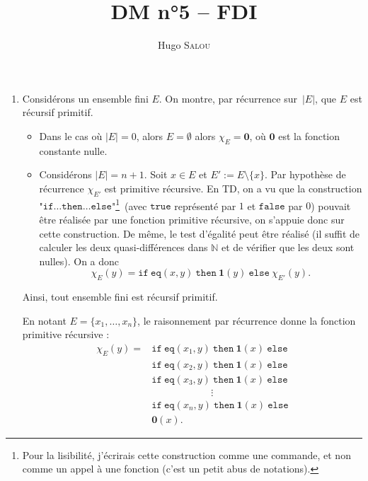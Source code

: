 \documentclass{../../notes}
\title{DM n°5 -- FDI}
\author{Hugo \scshape Salou}
\begin{document}
  \maketitle

  \begin{enumerate}
    \item Considérons un ensemble fini $E$.
      On montre, par récurrence sur~$|E|$, que $E$ est récursif primitif.\label{q1}
      \begin{itemize}
        \item Dans le cas où $|E| = 0$, alors $E = \emptyset$ alors $\chi_E = \mathbf{0}$, où $\mathbf{0}$ est la fonction constante nulle.
        \item Considérons $|E| = n + 1$.
          Soit $x \in E$ et $E' := E \setminus \{x\}$.
          Par hypothèse de récurrence $\chi_{E'}$ est primitive récursive.
          En TD, on a vu que la construction "$\mathtt{if}\ldots \mathtt{then}\ldots \mathtt{else}$"\footnote{Pour la lisibilité, j'écrirais cette construction comme une commande, et non comme un appel à une fonction (c'est un petit abus de notations).}\showfootnote\ (avec $\mathtt{true}$ représenté par $1$ et $\mathtt{false}$ par $0$) pouvait être réalisée par une fonction primitive récursive, on s'appuie donc sur cette construction.
          De même, le test d'égalité peut être réalisé (il suffit de calculer les deux quasi-différences dans $\mathds{N}$ et de vérifier que les deux sont nulles).
          On a donc \[
            \chi_{E}(y) = \mathtt{if}\ \mathtt{eq}(x,y)\ \mathtt{then}\ \mathbf{1}(y)\ \mathtt{else}\ \chi_{E'}(y)
          .\]
      \end{itemize}
      Ainsi, tout ensemble fini est récursif primitif.

      En notant $E = \{x_1, \ldots, x_n\}$, le raisonnement par récurrence donne la fonction primitive récursive :
      \begin{align*}
        \chi_E(y) ={}& \mathtt{if}\ \mathtt{eq}(x_1, y)\ \mathtt{then}\ \mathbf{1}(x)\ \mathtt{else}\\
                     & \mathtt{if}\ \mathtt{eq}(x_2, y)\ \mathtt{then}\ \mathbf{1}(x)\ \mathtt{else}\\
                     & \mathtt{if}\ \mathtt{eq}(x_3, y)\ \mathtt{then}\ \mathbf{1}(x)\ \mathtt{else}\\
                     & \qquad \qquad \qquad \vdots \\
                     & \mathtt{if}\ \mathtt{eq}(x_n, y)\ \mathtt{then}\ \mathbf{1}(x)\ \mathtt{else}\\
                     & \mathbf{0}(x)
      .\end{align*}


\end{enumerate}
\end{document}
